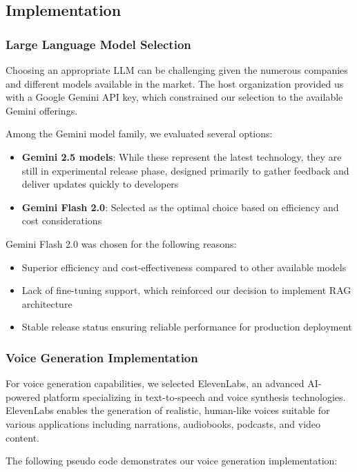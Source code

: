 \subsection{Implementation}

\subsubsection{Large Language Model Selection}
Choosing an appropriate LLM can be challenging given the numerous companies and different models available in the market. The host organization provided us with a Google Gemini API key, which constrained our selection to the available Gemini offerings.

Among the Gemini model family, we evaluated several options:
\begin{itemize}
    \item \textbf{Gemini 2.5 models}: While these represent the latest technology, they are still in experimental release phase, designed primarily to gather feedback and deliver updates quickly to developers
    \item \textbf{Gemini Flash 2.0}: Selected as the optimal choice based on efficiency and cost considerations
\end{itemize}

Gemini Flash 2.0 was chosen for the following reasons:
\begin{itemize}
    \item Superior efficiency and cost-effectiveness compared to other available models
    \item Lack of fine-tuning support, which reinforced our decision to implement RAG architecture
    \item Stable release status ensuring reliable performance for production deployment
\end{itemize}

\subsubsection{Voice Generation Implementation}
For voice generation capabilities, we selected ElevenLabs, an advanced AI-powered platform specializing in text-to-speech and voice synthesis technologies. ElevenLabs enables the generation of realistic, human-like voices suitable for various applications including narrations, audiobooks, podcasts, and video content.

The following pseudo code demonstrates our voice generation implementation:

